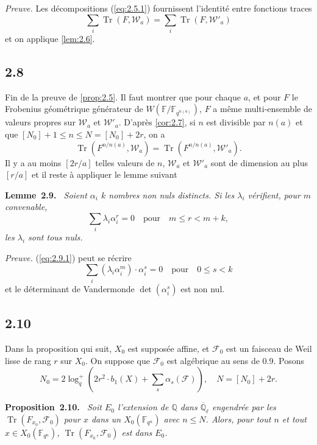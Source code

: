 \documentclass[11pt,a4paper]{article}
\makeatletter
\theoremstyle{plain}
\theoremstyle{definition}
\newenvironment{manualblock}[4]{%
  \par\medskip\noindent\textbf{#1~#2#3.}\def\@currentlabel{#2}\label{#4}\itshape\ }{\par\normalfont\medskip}
\DeclareMathOperator{\tr}{Tr}
\makeatother
\begin{document}
\noindent\textit{Preuve.} Les d\'ecompositions (\ref{eq:2.5.1}) fournissent l'identit\'e entre fonctions traces
\[
\sum_i \tr(F, \mathcal{W}_a) = \sum_i \tr(F, \mathcal{W}'_a)
\]
et on applique \ref{lem:2.6}.

\subsection*{2.8}

Fin de la preuve de \ref{prop:2.5}. Il faut montrer que pour chaque $a$, et pour $F$ le Frobenius g\'eom\'etrique g\'en\'erateur de $W(\mathbb{F}/\mathbb{F}_{q^{n(a)}})$, $F$ a m\^eme multi-ensemble de valeurs propres sur $\mathcal{W}_a$ et $\mathcal{W}'_a$. D'apr\`es \ref{cor:2.7}, si $n$ est divisible par $n(a)$ et que $[N_0]+1 \leq n \leq N = [N_0]+2r$, on a
\[
\tr(F^{n/n(a)}, \mathcal{W}_a) = \tr(F^{n/n(a)}, \mathcal{W}'_a).
\]
Il y a au moins $[2r/a]$ telles valeurs de $n$, $\mathcal{W}_a$ et $\mathcal{W}'_a$ sont de dimension au plus $[r/a]$ et il reste \`a appliquer le lemme suivant

\begin{manualblock}{Lemme}{2.9}{}{lem:2.9}
Soient $\alpha_i$ $k$ nombres non nuls distincts. Si les $\lambda_i$ v\'erifient, pour $m$ convenable,
\begin{equation}\label{eq:2.9.1}
\sum_i \lambda_i \alpha_i^r = 0 \quad \text{pour} \quad m \leq r < m+k,
\end{equation}
les $\lambda_i$ sont tous nuls.
\end{manualblock}

\noindent\textit{Preuve.} (\ref{eq:2.9.1}) peut se r\'ecrire
\[
\sum_i (\lambda_i \alpha_i^m) \cdot \alpha_i^s = 0 \quad \text{pour} \quad 0 \leq s < k
\]
et le d\'eterminant de Vandermonde $\det(\alpha_i^s)$ est non nul.

\subsection*{2.10}

Dans la proposition qui suit, $X_0$ est suppos\'ee affine, et $\mathcal{F}_0$ est un faisceau de Weil lisse de rang $r$ sur $X_0$. On suppose que $\mathcal{F}_0$ est alg\'ebrique au sens de 0.9. Posons
\[
N_0 = 2\log_q^+\left(2r^2 \cdot b_1(X) + \sum_s \alpha_s(\mathcal{F})\right), \quad N = [N_0] + 2r.
\]
\begin{manualblock}{Proposition}{2.10}{}{prop:2.10}
Soit $E_0$ l'extension de $\mathbb{Q}$ dans $\overline{\mathbb{Q}}_\ell$ engendr\'ee par les $\tr(F_{x_0}, \mathcal{F}_0)$ pour $x$ dans un $X_0(\mathbb{F}_{q^n})$ avec $n \leq N$. Alors, pour tout $n$ et tout $x \in X_0(\mathbb{F}_{q^n})$, $\tr(F_{x_0}, \mathcal{F}_0)$ est dans $E_0$.
\end{manualblock}
\end{document}
